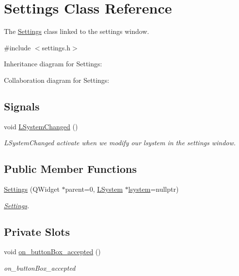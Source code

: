 \hypertarget{classSettings}{}\section{Settings Class Reference}
\label{classSettings}


The \hyperlink{classSettings}{Settings} class linked to the settings window.  




{\ttfamily \#include $<$settings.\+h$>$}



Inheritance diagram for Settings\+:


Collaboration diagram for Settings\+:
\subsection*{Signals}
\begin{DoxyCompactItemize}
\item 
\mbox{\label{classSettings_aa812af36c4d0153966862e7b2703e084}} 
void \hyperlink{classSettings_aa812af36c4d0153966862e7b2703e084}{L\+System\+Changed} ()
\begin{DoxyCompactList}\small\item\em L\+System\+Changed activate when we modify our lsystem in the settings window. \end{DoxyCompactList}\end{DoxyCompactItemize}
\subsection*{Public Member Functions}
\begin{DoxyCompactItemize}
\item 
\hyperlink{classSettings_a77888f988e8b0ae49f6785184fa33094}{Settings} (Q\+Widget $\ast$parent=0, \hyperlink{classLSystem}{L\+System} $\ast$\hyperlink{classSettings_acf127d11a221e397e87f99bc49a268d4}{lsystem}=nullptr)
\begin{DoxyCompactList}\small\item\em \hyperlink{classSettings}{Settings}. \end{DoxyCompactList}\end{DoxyCompactItemize}
\subsection*{Private Slots}
\begin{DoxyCompactItemize}
\item 
void \hyperlink{classSettings_a65022df92b08690beb9b28fe4885504c}{on\+\_\+button\+Box\+\_\+accepted} ()
\begin{DoxyCompactList}\small\item\em on\+\_\+button\+Box\+\_\+accepted \end{DoxyCompactList}\end{DoxyCompactItemize}
